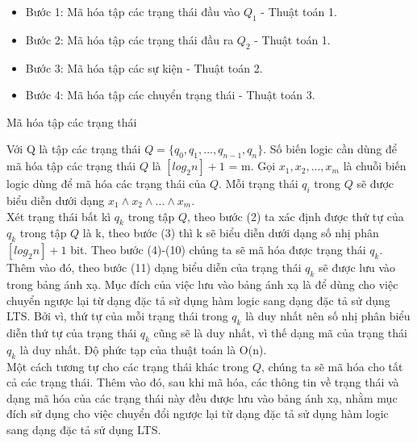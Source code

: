 \documentclass{article}
\newenvironment{megaalgorithm}[1][htb]
{\renewcommand{\algorithmcfname}{Thuật toán}%
	\begin{algorithm}[#1]%
}{\end{algorithm}}
\begin{document}
\begin{flushleft}
		\begin{itemize}
			\item Bước 1: Mã hóa tập các trạng thái đầu vào $Q_1$ - Thuật toán 1.
			\item Bước 2: Mã hóa tập các trạng thái đầu ra $Q_2$ - Thuật toán 1.
			\item Bước 3: Mã hóa tập các sự kiện - Thuật toán 2.
			\item Bước 4: Mã hóa tập các chuyển trạng thái - Thuật toán 3.
		\end{itemize}
		\begin{megaalgorithm}[H]
			\SetAlgoLined
			\DontPrintSemicolon
				
			\caption{Mã hóa tập các trạng thái}
		\end{megaalgorithm}
		Với Q là tập các trạng thái $Q = \{q_0, q_1, ..., q_{n-1}, q_n\}$. Số biến logic cần dùng để mã hóa tập các trạng thái $Q$ là $[log_{2}n] + 1$ = m. Gọi $x_{1}, x_{2}, ..., x_{m}$ là chuỗi biến logic dùng để mã hóa các trạng thái của $Q$. Mỗi trạng thái $q_i$ trong $Q$ sẽ được biểu diễn dưới dạng $x_{1}\land x_{2}\land...\land x_{m}$.\\
		Xét trạng thái bất kì $q_k$ trong tập $Q$, theo bước (2) ta xác định được thứ tự của $q_k$ trong tập $Q$ là k, theo bước (3) thì k sẽ biểu diễn dưới dạng số nhị phân $[log_{2}n] + 1$ bit. Theo bước (4)-(10) chúng ta sẽ mã hóa được trạng thái $q_k$. Thêm vào đó, theo bước (11) dạng biểu diễn của trạng thái $q_k$ sẽ được lưu vào trong bảng ánh xạ. Mục đích của việc lưu vào bảng ánh xạ là để dùng cho việc chuyển ngược lại từ dạng đặc tả sử dụng hàm logic sang dạng đặc tả sử dụng LTS. Bởi vì, thứ tự của mỗi trạng thái trong $q_k$ là duy nhất nên số nhị phân biểu diễn thứ tự của trạng thái $q_k$ cũng sẽ là duy nhất, vì thế dạng mã của trạng thái $q_k$ là duy nhất. Độ phức tạp của thuật toán là O(n).\\
		Một cách tương tự cho các trạng thái khác trong $Q$, chúng ta sẽ mã hóa cho tất cả các trạng thái. Thêm vào đó, sau khi mã hóa, các thông tin về trạng thái và dạng mã hóa của các trạng thái này đều được lưu vào bảng ánh xạ, nhằm mục đích sử dụng cho việc chuyển đổi ngược lại từ dạng đặc tả sử dụng hàm logic sang dạng đặc tả sử dụng LTS.\\		
		

\end{flushleft}
\end{document}
